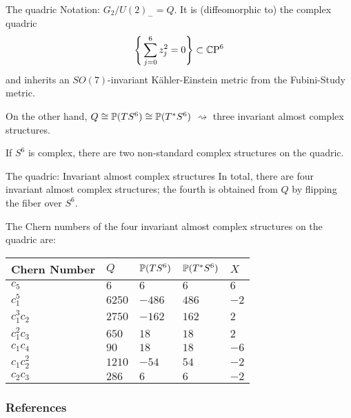 \documentclass[11pt,parskip]{beamer}
\begin{document}
\begin{frame}{The quadric}
	Notation: $G_2/U(2)_-=Q$. It is (diffeomorphic to) the complex quadric 
	\begin{equation*}
		\Bigg\{ \sum_{j=0}^6 z_j^2=0\Bigg\} \subset \CP^6
	\end{equation*}
	and inherits an $SO(7)$-invariant K\"ahler-Einstein metric from the Fubini-Study metric. \pause
	
	\bigskip
	
	On the other hand, $Q\cong \P(TS^6)\cong \P(T^*S^6)$ $\rightsquigarrow$ three invariant almost complex structures.\pause
	
	\begin{rem}
		If $S^6$ is complex, there are two non-standard complex structures on the quadric.
	\end{rem}
\end{frame}

\begin{frame}{The quadric: Invariant almost complex structures}
	In total, there are four invariant almost complex structures; the fourth is obtained from $Q$ by flipping the fiber over $S^6$.
	\begin{prop}
		The Chern numbers of the four invariant almost complex structures on the quadric are:\vspace{-0.5cm}
		\begin{table}[ht!]\centering\hspace{1cm}
			\begin{tabular}{lllll} \toprule
				Chern Number& $Q$		& $\P(TS^6)$ 	& $\P(T^*S^6)$	& $X$ \\ \midrule
				$c_5$ 		& $6$ 		& $6$ 			& $6$			& $6$\\
				$c_1^5$ 	& $6250$	& $-486$		& $486$			& $-2$\\
				$c_1^3c_2$	& $2750$ 	& $-162$		& $162$			& $2$\\
				$c_1^2c_3$	& $650$ 	& $18$ 			& $18$			& $2$\\
				$c_1c_4$	& $90$ 		& $18$ 			& $18$			& $-6$\\
				$c_1c_2^2$	& $1210$ 	& $-54$ 		& $54$			& $-2$\\
				$c_2c_3$	& $286$ 	& $6$			& $6$			& $-2$\\ \bottomrule
			\end{tabular}
		\end{table}
	\end{prop}
\end{frame}


\begin{frame}[allowframebreaks]\frametitle{References}
\printbibliography
\end{frame}
	
	
\end{document}
